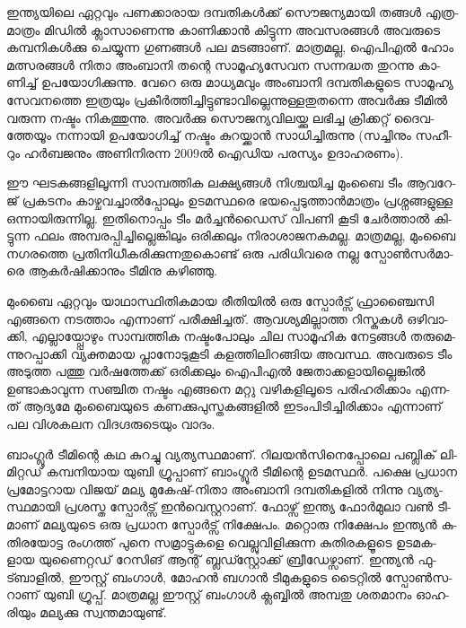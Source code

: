 
ഇ­ന്ത്യ­യി­ലെ ഏറ്റ­വും പണ­ക്കാ­രായ ദമ്പ­തി­കള്‍­ക്ക് സൌ­ജ­ന്യ­മാ­യി തങ്ങള്‍ എത്ര­മാ­ത്രം മി­ഡില്‍ ക്ലാ­സാ­ണെ­ന്നു 
കാ­ണി­ക്കാന്‍ കി­ട്ടു­ന്ന അവ­സ­ര­ങ്ങള്‍ അവ­രു­ടെ കമ്പ­നി­കള്‍­ക്കു ചെ­യ്യു­ന്ന ഗു­ണ­ങ്ങള്‍ പല മട­ങ്ങാ­ണ്. മാ­ത്ര­മ­ല്ല, 
ഐപി­എല്‍ ഹോം മത്സ­ര­ങ്ങള്‍ നി­താ അം­ബാ­നി തന്റെ സാ­മൂ­ഹ്യ­സേ­വന സന്ന­ദ്ധത തു­റ­ന്നു കാ­ണി­ച്ച് ഉപ­യോ­ഗി­ക്കു­ന്നു. 
വേ­റെ ഒരു മാ­ധ്യ­മ­വും അം­ബാ­നി ദമ്പ­തി­ക­ളു­ടെ സാ­മൂ­ഹ്യ സേ­വ­ന­ത്തെ ഇത്ര­യും പ്ര­കീര്‍­ത്തി­ച്ചി­ട്ടു­ണ്ടാ­വി­ല്ലെ­ന്നു­ള്ള­തു­ത­ന്നെ 
അവര്‍­ക്കു ടീ­മില്‍ വരു­ന്ന നഷ്ടം നി­ക­ത്തു­ന്നു. അവര്‍­ക്കു സൌ­ജ­ന്യ­വി­ല­യ്ക്കു ലഭി­ച്ച ­ക്രി­ക്ക­റ്റ് ദൈ­വ­ത്തേ­യൂം നന്നാ­യി ഉപ­യോ­ഗി­ച്ച് 
നഷ്ടം കു­റ­യ്ക്കാന്‍ സാ­ധി­ച്ചി­രു­ന്നു (സ­ച്ചി­നും സഹീ­റും ഹര്‍­ബ­ജ­നും അണി­നി­ര­ന്ന 2009ല്‍ ഐഡിയ ­പ­ര­സ്യം­ ഉദാ­ഹ­ര­ണം­).

ഈ ഘട­ക­ങ്ങ­ളി­ലൂ­ന്നി സാ­മ്പ­ത്തിക ലക്ഷ്യ­ങ്ങള്‍ നി­ശ്ച­യി­ച്ച മും­ബൈ ടീം ആവ­റേ­ജ് പ്ര­ക­ട­നം കാ­ഴ്ച­വ­ച്ചാല്‍­പ്പോ­ലും ഉട­മ­സ്ഥ­രെ 
ഭയ­പ്പെ­ടു­ത്താന്‍­മാ­ത്രം പ്ര­ശ്ന­ങ്ങ­ളു­ള്ള ഒന്നാ­യി­രു­ന്നി­ല്ല. ഇതി­നൊ­പ്പം ടീം മര്‍­ച്ചന്‍­ഡൈ­സ് വി­പ­ണി കൂ­ടി ചേര്‍­ത്താല്‍ കി­ട്ടു­ന്ന 
ഫലം അമ്പ­ര­പ്പി­ച്ചി­ല്ലെ­ങ്കി­ലും ഒരി­ക്ക­ലും നി­രാ­ശാ­ജ­ന­ക­മ­ല്ല. മാ­ത്ര­മ­ല്ല, മും­ബൈ നഗ­ര­ത്തെ പ്ര­തി­നി­ധീ­ക­രി­ക്കു­ന്ന­തു­കൊ­ണ്ട് ഒരു 
പരി­ധി­വ­രെ നല്ല സ്പോണ്‍­സര്‍­മാ­രെ ആകര്‍­ഷി­ക്കാ­നും ടീ­മി­നു കഴി­ഞ്ഞു­.

­മും­ബൈ ഏറ്റ­വും യാ­ഥാ­സ്ഥി­തി­ക­മായ രീ­തി­യില്‍ ഒരു സ്പോര്‍­ട്സ് ഫ്രാ­ഞ്ചൈ­സി എങ്ങ­നെ നട­ത്താം എന്നാ­ണ് പരീ­ക്ഷി­ച്ച­ത്. 
ആവ­ശ്യ­മി­ല്ലാ­ത്ത റി­സ്കു­കള്‍ ഒഴി­വാ­ക്കി, എല്ലാ­യ്പ്പോ­ഴും സാ­മ്പ­ത്തിക നഷ്ടം­പോ­ലും ചില സാ­മൂ­ഹിക നേ­ട്ട­ങ്ങള്‍ തരു­മെ­ന്നു­റ­പ്പാ­ക്കി 
വ്യ­ക്ത­മായ പ്ലാ­നോ­ടു­കൂ­ടി കള­ത്തി­ലി­റ­ങ്ങിയ അവ­സ്ഥ. അവ­രു­ടെ ടീം അടു­ത്ത പത്തു വര്‍­ഷ­ത്തേ­ക്ക് ഒരി­ക്ക­ലും ഐപി­എല്‍ 
ജേ­താ­ക്ക­ളാ­യി­ല്ലെ­ങ്കില്‍ ഉണ്ടാ­കാ­വു­ന്ന സഞ്ചിത നഷ്ടം എങ്ങ­നെ മറ്റു വഴി­ക­ളി­ലൂ­ടെ പരി­ഹ­രി­ക്കാം എന്ന­ത് ആദ്യ­മേ മും­ബൈ­യു­ടെ 
കണ­ക്കു­പു­സ്ത­ക­ങ്ങ­ളില്‍ ഇടം­പി­ടി­ച്ചി­രി­ക്കാം എന്നാ­ണ് പല വി­ശ­ക­ലന വി­ദ­ഗ്ദ­രു­ടെ­യും വാ­ദം­.

­ബാം­ഗ്ലൂര്‍ ടീ­മി­ന്റെ കഥ കു­റ­ച്ചു വ്യ­ത്യ­സ്ഥ­മാ­ണ്. റി­ല­യന്‍­സി­നെ­പ്പോ­ലെ പബ്ലി­ക് ലി­മി­റ്റ­ഡ് കമ്പ­നി­യായ യു­ബി ഗ്രൂ­പ്പാ­ണ് 
ബാം­ഗ്ലൂര്‍ ടീ­മി­ന്റെ ഉട­മ­സ്ഥര്‍. പക്ഷെ പ്ര­ധാന പ്ര­മോ­ട്ട­റായ ­വി­ജ­യ് മല്യ മു­കേ­ഷ്-നി­താ അം­ബാ­നി ദമ്പ­തി­ക­ളില്‍ നി­ന്നു 
വ്യ­ത്യ­സ്ഥ­മാ­യി പ്ര­ശ­സ്ത സ്പോര്‍­ട്സ് ഇന്‍­വെ­സ്റ്റ­റാ­ണ്. ഫോ­ഴ്സ് ഇന്ത്യ ഫോര്‍­മു­ലാ വണ്‍ ടീ­മാ­ണ് മല്യ­യു­ടെ ഒരു പ്ര­ധാന 
സ്പോര്‍­ട്സ് നി­ക്ഷേ­പം. മറ്റൊ­രു നി­ക്ഷേ­പം ഇന്ത്യന്‍ കു­തി­ര­യോ­ട്ട രം­ഗ­ത്ത് പു­നെ സമ്രാ­ട്ടു­ക­ളെ വെ­ല്ലു­വി­ളി­ക്കു­ന്ന കു­തി­ര­ക­ളൂ­ടെ 
ഉട­മ­ക­ളായ യു­ണൈ­റ്റ­ഡ് റേ­സി­ങ് ആന്റ് ബ്ല­ഡ്സ്റ്റോ­ക്ക് ബ്രീ­ഡേ­ഴ്സാ­ണ്. ഇന്ത്യന്‍ ഫു­ട്ബാ­ളില്‍, ഈസ്റ്റ് ബം­ഗാള്‍, 
മോ­ഹന്‍ ബഗാന്‍ ടീ­മു­ക­ളു­ടെ ടൈ­റ്റില്‍ സ്പോണ്‍­സ­റാ­ണ് ­യു­ബി ഗ്രൂ­പ്പ്. മാ­ത്ര­മ­ല്ല ഈസ്റ്റ് ബം­ഗാള്‍ ക്ല­ബ്ബില്‍ അമ്പ­തു 
ശത­മാ­നം ഓഹ­രി­യും മല്യ­ക്കു സ്വ­ന്ത­മാ­യു­ണ്ട്.

